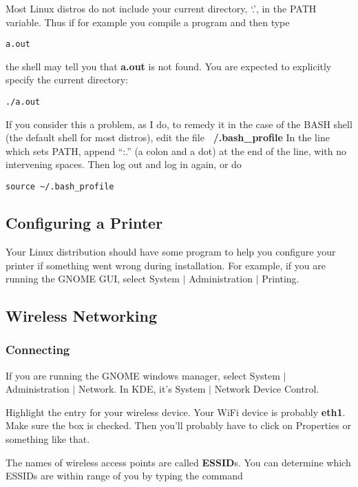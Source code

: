 \documentclass[11pt]{article}
\begin{document}
Most Linux distros do not include your current directory, `.',
in the PATH variable. Thus if for example you compile a program and then
type

\begin{verbatim}
a.out
\end{verbatim}

the shell may tell you that {\bf a.out} is not found. You are expected
to explicitly specify the current directory:

\begin{verbatim}
./a.out
\end{verbatim}

If you consider this a problem, as I do, to remedy it in the case of the
BASH shell (the default shell for most distros), edit the file {\bf
~/.bash\_profile} In the line which sets PATH, append ``:.'' (a colon
and a dot) at the end of the line, with no intervening spaces.  Then log
out and log in again, or do

\begin{verbatim}
source ~/.bash_profile
\end{verbatim}

\subsection{Configuring a Printer}

Your Linux distribution should have some program to help you configure
your printer if something went wrong during installation.  For example,
if you are running the GNOME GUI, select System $|$ Administration $|$
Printing.

\subsection{Wireless Networking}
\label{wifi}

\subsubsection{Connecting}

If you are running the GNOME windows manager, select System $|$
Administration $|$ Network.  In KDE, it's System $|$ Network Device
Control.  

Highlight the entry for your wireless device.  Your WiFi device is
probably {\bf eth1}.  Make sure the box is checked.  Then you'll
probably have to click on Properties or something like that.

The names of wireless access points are called {\bf ESSID}s.  You can
determine which ESSIDs are within range of you by typing the command 
\end{document}
